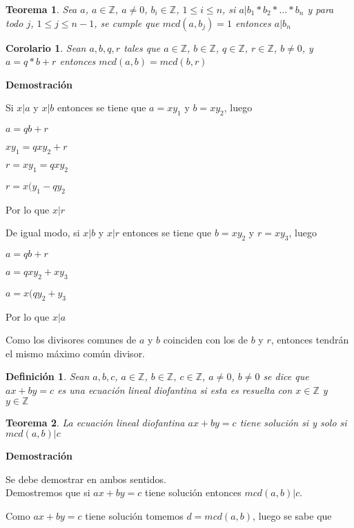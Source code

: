 \documentclass[a4paper,1pt]{report}
\newtheorem*{teo}{Teorema}
\newtheorem*{cor}{Corolario}
\newtheorem*{dfn}{Definición}
\begin{document}
\begin{teo}
 Sea $a$, $a\in\mathbb{Z}$, $a\neq 0$, $b_i\in\mathbb{Z}$, $1\leq i \leq n$, si $a|b_1*b_2*\dots *b_n$ y para  todo $j$, $1\leq j \leq n-1$, se cumple que $mcd(a,b_j)=1$ entonces $a|b_n$
\end{teo}

\begin{cor}
 Sean $a,b,q,r$ tales que $a\in\mathbb{Z}$, $b\in\mathbb{Z}$, $q\in\mathbb{Z}$, $r\in\mathbb{Z}$, $b\neq 0$, y $a=q*b+r$ entonces $mcd(a,b)=mcd(b,r)$
\end{cor}

\textbf{Demostración}



Si $x|a$ y $x|b$ entonces se tiene que $a=xy_1$ y $b=xy_2$, luego 

$a=qb+r$

$xy_1 = qxy_2 + r$

$r = xy_1 = qxy_2$

$r = x(y_1-qy_2$

Por lo que $x|r$

De igual modo, si $x|b$ y $x|r$ entonces se tiene que $b=xy_2$ y $r=xy_3$, luego

$a=qb+r$

$a=qxy_2+xy_3$

$a=x(qy_2+y_3$

Por lo que $x|a$

Como los divisores comunes de $a$ y $b$ coinciden con los de $b$ y $r$, entonces tendrán el mismo máximo común divisor.

\begin{dfn}
 Sean $a,b,c$, $a\in\mathbb{Z}$, $b\in\mathbb{Z}$, $c\in\mathbb{Z}$, $a\neq 0$, $b\neq 0$ se dice que $ax+by=c$ es una ecuación lineal diofantina si esta es resuelta con $x\in\mathbb{Z}$ y $y\in\mathbb{Z}$
\end{dfn}

\begin{teo}
 La ecuación lineal diofantina $ax+by=c$ tiene solución si y solo si $mcd(a,b)|c$
\end{teo}

\textbf{Demostración}

Se debe demostrar en ambos sentidos.
\\

Demostremos que si $ax+by=c$ tiene solución entonces $mcd(a,b)|c$.

Como $ax+by=c$ tiene solución tomemos $d=mcd(a,b)$, luego se sabe que
\end{document}
